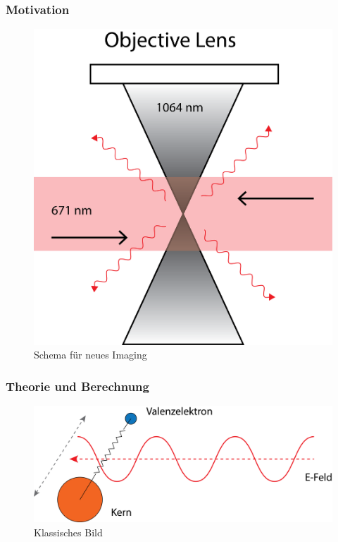 \documentclass{beamer}
\begin{document}
\begin{frame}
	\frametitle{Motivation}
	\begin{figure}
	\centering
	\includegraphics[scale=0.22]{newscheme}
	\caption{Schema für neues Imaging}
	\end{figure}
\end{frame}
\begin{frame}
	\frametitle{Theorie und Berechnung}
	\begin{figure}
	\centering
	\includegraphics[scale=0.22]{feder}
	\caption{Klassisches Bild}
	\end{figure}
\end{frame}
\end{document}
